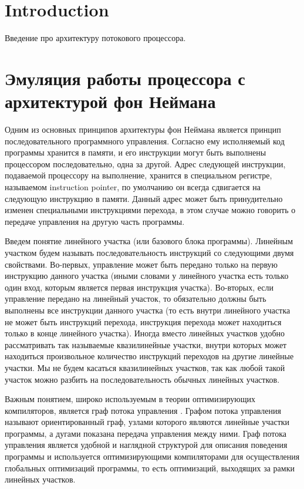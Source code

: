 \documentclass[
11pt,%
tightenlines,%
twoside,%
onecolumn,%
nofloats,%
nobibnotes,%
nofootinbib,%
superscriptaddress,%
noshowpacs,%
centertags]%
{revtex4}
\begin{document}
\section{Introduction}

Введение про архитектуру потокового процессора.

\section{Эмуляция работы процессора с архитектурой фон Неймана}

Одним из основных принципов архитектуры фон Неймана является принцип последовательного программного управления.
Согласно ему исполняемый код программы хранится в памяти, и его инструкции могут быть выполнены процессором последовательно, одна за другой.
Адрес следующей инструкции, подаваемой процессору на выполнение, хранится в специальном регистре, называемом instruction pointer, по умолчанию он всегда сдвигается на следующую инструкцию в памяти.
Данный адрес может быть принудительно изменен специальными инструкциями перехода, в этом случае можно говорить о передаче управления на другую часть программы.

Введем понятие линейного участка (или базового блока программы).
Линейным участком будем называть последовательность инструкций со следующими двумя свойствами.
Во-первых, управление может быть передано только на первую инструкцию данного участка (иными словами у линейного участка есть только один вход, которым является первая инструкция участка).
Во-вторых, если управление передано на линейный участок, то обязательно должны быть выполнены все инструкции данного участка (то есть внутри линейного участка не может быть инструкций перехода, инструкция перехода может находиться только в конце линейного участка).
Иногда вместо линейных участков удобно рассматривать так называемые квазилинейные участки, внутри которых может находиться произвольное количество инструкций переходов на другие линейные участки.
Мы не будем касаться квазилинейных участков, так как любой такой участок можно разбить на последовательность обычных линейных участков.

Важным понятием, широко используемым в теории оптимизирующих компиляторов, является граф потока управления \cite{Muchnick}.
Графом потока управления называют ориентированный граф, узлами которого являются линейные участки программы, а дугами показана передача управления между ними.
Граф потока управления является удобной и наглядной структурой для описания поведения программы и используется оптимизирующими компиляторами для осуществления глобальных оптимизаций программы, то есть оптимизаций, выходящих за рамки линейных участков.
\end{document}
